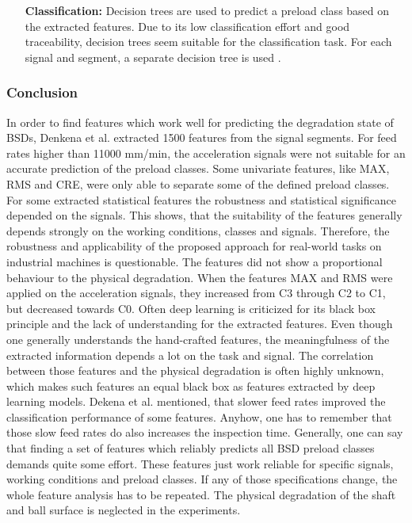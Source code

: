 \begin{itemize}
    \item [\textbf{Classification:}] Decision trees are used to predict a preload class based on the extracted features. Due to its low classification effort and good traceability, decision trees seem suitable for the classification task. For each signal and segment, a separate decision tree is used \cite{Denkena2021}. 
\end{itemize}

\subsubsection{Conclusion}
In order to find features which work well for predicting the degradation state of BSDs, Denkena et al. \cite{Denkena2021} extracted 1500 features from the signal segments. For feed rates higher than 11000 mm/min, the acceleration signals were not suitable for an accurate prediction of the preload classes. Some univariate features, like MAX, RMS and CRE, were only able to separate some of the defined preload classes. For some extracted statistical features the robustness and statistical significance depended on the signals. This shows, that the suitability of the features generally depends strongly on the working conditions, classes and signals. Therefore, the robustness and applicability of the proposed approach for real-world tasks on industrial machines is questionable. The features did not show a proportional behaviour to the physical degradation. When the features MAX and RMS were applied on the acceleration signals, they increased from C3 through C2 to C1, but decreased towards C0. Often deep learning is criticized for its black box principle and the lack of understanding for the extracted features. Even though one generally understands the hand-crafted features, the meaningfulness of the extracted information depends a lot on the task and signal. The correlation between those features and the physical degradation is often highly unknown, which makes such features an equal black box as features extracted by deep learning models. Dekena et al. \cite{Denkena2021} mentioned, that slower feed rates improved the classification performance of some features. Anyhow, one has to remember that those slow feed rates do also increases the inspection time. Generally, one can say that finding a set of features which reliably predicts all BSD preload classes demands quite some effort. These features just work reliable for specific signals, working conditions and preload classes. If any of those specifications change, the whole feature analysis has to be repeated. The physical degradation of the shaft and ball surface is neglected in the experiments.

